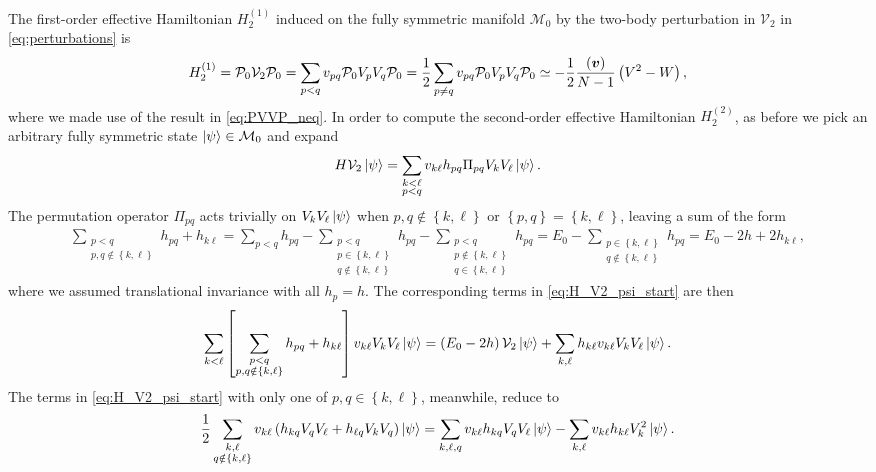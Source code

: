 \documentclass[nofootinbib,notitlepage,11pt]{revtex4-2}
\newcommand{\f}[2]{\dfrac{#1}{#2}} %
\newcommand{\p}[1]{\left(#1\right)} %
\renewcommand{\sp}[1]{\left[#1\right]} %
\renewcommand{\set}[1]{\left\{#1\right\}} %
\renewcommand{\v}{\bm} %
\newcommand{\1}{\mathds{1}}
\newcommand{\M}{\mathcal{M}}
\renewcommand{\P}{\mathcal{P}}
\newcommand{\V}{\mathcal{V}}
\let\var\relax
\DeclareMathOperator{\var}{var}
\begin{document}
The first-order effective Hamiltonian $H_2^{(1)}$ induced on the fully
symmetric manifold $\M_0$ by the two-body perturbation in $\V_2$ in
\eqref{eq:perturbations} is
\begin{align}
  H_2^{(1)}
  = \P_0 \V_2 \P_0
  = \sum_{p<q} v_{pq} \P_0 V_p V_q \P_0
  = \f12 \sum_{p\ne q} v_{pq} \P_0 V_p V_q \P_0
  \simeq -\f12 \f{\var\p{\v v}}{N-1} \p{V^2 - W},
\end{align}
where we made use of the result in \eqref{eq:PVVP_neq}.  In order to
compute the second-order effective Hamiltonian $H_2^{(2)}$, as before
we pick an arbitrary fully symmetric state $\ket\psi\in\M_0$ and
expand
\begin{align}
  H \V_2 \ket\psi
  = \sum_{\substack{k<\ell\\p<q}} v_{k\ell} h_{pq}
  \Pi_{pq} V_k V_\ell \ket\psi.
  \label{eq:H_V2_psi_start}
\end{align}
The permutation operator $\Pi_{pq}$ acts trivially on
$V_k V_\ell \ket\psi$ when $p,q\notin\set{k,\ell}$ or
$\set{p,q}=\set{k,\ell}$, leaving a sum of the form
\begin{align}
  \sum_{\substack{p<q\\p,q\notin\set{k,\ell}}} h_{pq} + h_{k\ell}
  = \sum_{p<q} h_{pq}
  - \sum_{\substack{p<q\\p\in\set{k,\ell}\\q\notin\set{k,\ell}}} h_{pq}
  - \sum_{\substack{p<q\\p\notin\set{k,\ell}\\q\in\set{k,\ell}}} h_{pq}
  = E_0 - \sum_{\substack{p\in\set{k,\ell}\\q\notin\set{k,\ell}}} h_{pq}
  = E_0 - 2 h + 2 h_{k\ell},
\end{align}
where we assumed translational invariance with all $h_p=h$.  The
corresponding terms in \eqref{eq:H_V2_psi_start} are then
\begin{align}
  \sum_{k<\ell}
  \sp{\sum_{\substack{p<q\\p,q\notin\set{k,\ell}}} h_{pq} + h_{k\ell}}
  v_{k\ell} V_k V_\ell \ket\psi
  = \p{E_0-2h} \V_2 \ket\psi
  + \sum_{k,\ell} h_{k\ell} v_{k\ell} V_k V_\ell \ket\psi.
\end{align}
The terms in \eqref{eq:H_V2_psi_start} with only one of
$p,q\in\set{k,\ell}$, meanwhile, reduce to
\begin{align}
  \f12 \sum_{\substack{k,\ell\\q\notin\set{k,\ell}}}
  v_{k\ell} \p{h_{kq} V_q V_\ell + h_{\ell q} V_k V_q} \ket\psi
  = \sum_{k,\ell,q} v_{k\ell} h_{kq} V_q V_\ell \ket\psi
  - \sum_{k,\ell} v_{k\ell} h_{k\ell} V_k^2 \ket\psi.
\end{align}
\end{document}
